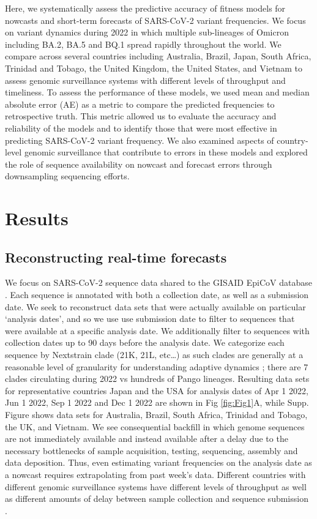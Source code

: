 \documentclass[10pt,letterpaper]{article}
\begin{document}
Here, we systematically assess the predictive accuracy of fitness models for nowcasts and short-term forecasts of SARS-CoV-2 variant frequencies.
We focus on variant dynamics during 2022 in which multiple sub-lineages of Omicron including BA.2, BA.5 and BQ.1 spread rapidly throughout the world.
We compare across several countries including Australia, Brazil, Japan, South Africa, Trinidad and Tobago, the United Kingdom, the United States, and Vietnam to assess genomic surveillance systems with different levels of throughput and timeliness.
To assess the performance of these models, we used mean and median absolute error (AE) as a metric to compare the predicted frequencies to retrospective truth.
This metric allowed us to evaluate the accuracy and reliability of the models and to identify those that were most effective in predicting SARS-CoV-2 variant frequency.
We also examined aspects of country-level genomic surveillance that contribute to errors in these models and explored the role of sequence availability on nowcast and forecast errors through downsampling sequencing efforts.

\section*{Results}

\subsection*{Reconstructing real-time forecasts}

We focus on SARS-CoV-2 sequence data shared to the GISAID EpiCoV database \cite{shu2017gisaid}.
Each sequence is annotated with both a collection date, as well as a submission date.
We seek to reconstruct data sets that were actually available on particular `analysis dates', and so we use use submission date to filter to sequences that were available at a specific analysis date.
We additionally filter to sequences with collection dates up to 90 days before the analysis date.
We categorize each sequence by Nextstrain clade (21K, 21L, etc\dots) as such clades are generally at a reasonable level of granularity for understanding adaptive dynamics \cite{bloom2023fitness}; there are 7 clades circulating during 2022 vs hundreds of Pango lineages.
Resulting data sets for representative countries Japan and the USA for analysis dates of Apr 1 2022, Jun 1 2022, Sep 1 2022 and Dec 1 2022 are shown in Fig \ref{fig:Fig1}A, while Supp. Figure  shows data sets for Australia, Brazil, South Africa, Trinidad and Tobago, the UK, and Vietnam.
We see consequential backfill in which genome sequences are not immediately available and instead available after a delay due to the necessary bottlenecks of sample acquisition, testing, sequencing, assembly and data deposition.
Thus, even estimating variant frequencies on the analysis date as a nowcast requires extrapolating from past week's data.
Different countries with different genomic surveillance systems have different levels of throughput as well as different amounts of delay between sample collection and sequence submission \cite{brito2022global}.
\end{document}
